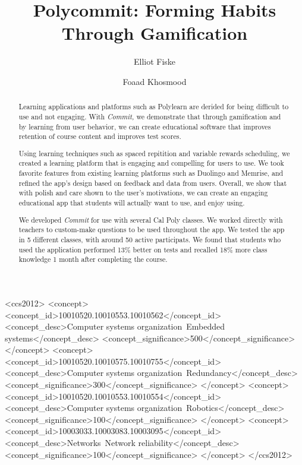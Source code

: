 \documentclass[sigconf]{acmart}
\begin{document}
\title{Polycommit: Forming Habits Through Gamification}



\author{Elliot Fiske}

\author{Foaad Khosmood}


\begin{abstract}
\par Learning applications and platforms such as Polylearn are derided for being difficult to use and not engaging. With \textit{Commit,} we demonstrate that through gamification and by learning from user behavior, we can create educational software that improves retention of course content and improves test scores.

\par Using learning techniques such as spaced repitition and variable rewards scheduling, we created a learning platform that is engaging and compelling for users to use. We took favorite features from existing learning platforms such as Duolingo and Memrise, and refined the app's design based on feedback and data from users. Overall, we show that with polish and care shown to the user's motivations, we can create an engaging educational app that students will actually want to use, and enjoy using.

\par We developed \textit{Commit} for use with several Cal Poly classes. We worked directly with teachers to custom-make questions to be used throughout the app. We tested the app in 5 different classes, with around 50 active participats. We found that students who used the application performed 13\% better on tests and recalled 18\% more class knowledge 1 month after completing the course.
\end{abstract}

%
%
\begin{CCSXML}
<ccs2012>
 <concept>
  <concept_id>10010520.10010553.10010562</concept_id>
  <concept_desc>Computer systems organization~Embedded systems</concept_desc>
  <concept_significance>500</concept_significance>
 </concept>
 <concept>
  <concept_id>10010520.10010575.10010755</concept_id>
  <concept_desc>Computer systems organization~Redundancy</concept_desc>
  <concept_significance>300</concept_significance>
 </concept>
 <concept>
  <concept_id>10010520.10010553.10010554</concept_id>
  <concept_desc>Computer systems organization~Robotics</concept_desc>
  <concept_significance>100</concept_significance>
 </concept>
 <concept>
  <concept_id>10003033.10003083.10003095</concept_id>
  <concept_desc>Networks~Network reliability</concept_desc>
  <concept_significance>100</concept_significance>
 </concept>
</ccs2012>  
\end{CCSXML}
\end{document}
